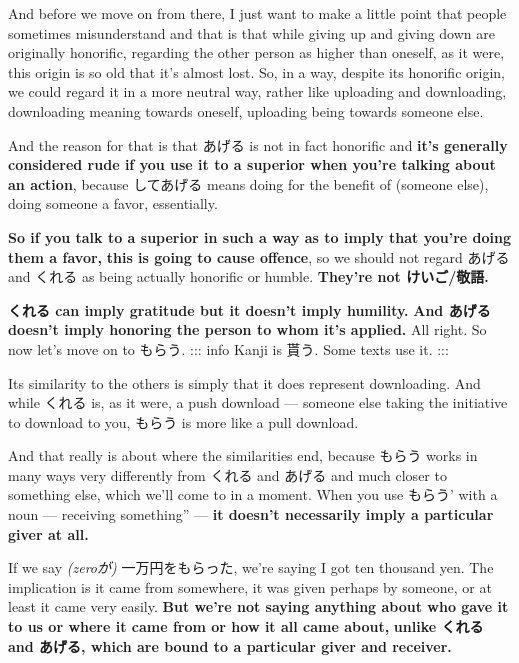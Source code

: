 {}

And before we move on from there, I just want to make a little point that people sometimes misunderstand and that is that while giving up and giving down are originally honorific, regarding the other person as higher than oneself, as it were, this origin is so old that it's almost lost. So, in a way, despite its honorific origin, we could regard it in a more neutral way, rather like uploading and downloading, downloading meaning towards oneself, uploading being towards someone else.

And the reason for that is that あげる is not in fact honorific and {\bf it's generally considered rude if you use it to a superior when you're talking about an action}, because してあげる means doing for the benefit of (someone else), doing someone a favor, essentially.

{}

{\bf So if you talk to a superior in such a way as to imply that you're doing them a favor,} {\bf this is going to cause offence}, so we should not regard あげる and くれる as being actually honorific or humble. {\bf They're not けいご/敬語.}

{\bf くれる can imply gratitude but it doesn't imply humility.} {\bf And あげる doesn't imply honoring the person to whom it's applied.} All right. So now let's move on to もらう. ::: info Kanji is 貰う. Some texts use it. :::

\startsectionlevel[title={もらう・てもらう},reference={もらうてもらう}]

Its similarity to the others is simply that it does represent downloading. And while くれる is, as it were, a push download --- someone else taking the initiative to download to you, もらう is more like a pull download.

{}

And that really is about where the similarities end, because もらう works in many ways very differently from くれる and あげる and much closer to something else, which we'll come to in a moment. When you use もらう' with a noun --- receiving something” --- {\bf it doesn't necessarily imply a particular giver at all.}

If we say {\em (zeroが)} 一万円をもらった, we're saying I got ten thousand yen. The implication is it came from somewhere, it was given perhaps by someone, or at least it came very easily. {\bf But we're not saying anything about who gave it to us or where it came from or how it all came about,} {\bf unlike くれる and あげる, which are bound to a particular giver and receiver.}

